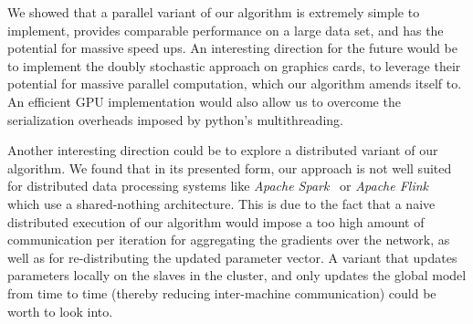 \documentclass{article} %
\begin{document}
We showed that a parallel variant of our algorithm is extremely simple to implement, provides comparable performance on a large data set, and has the potential for massive speed ups. An interesting direction for the future would be to implement the doubly stochastic approach on graphics cards, to leverage their potential for massive parallel computation, which our algorithm amends itself to. An efficient GPU implementation would also allow us to overcome the serialization overheads imposed by python's multithreading.

Another interesting direction could be to explore a distributed variant of our algorithm. We found that in its presented form, our approach is not well suited for distributed data processing systems like \textit{Apache Spark}~\cite{Zaharia2012} or \textit{Apache Flink}~\cite{Alexandrov2014} which use a shared-nothing architecture. This is due to the fact that a naive distributed execution of our algorithm would impose a too high amount of communication per iteration for aggregating the gradients over the network, as well as for re-distributing the updated parameter vector. A variant that updates parameters locally on the slaves in the cluster, and only updates the global model from time to time (thereby reducing inter-machine communication) could be worth to look into. 

\newpage

{\small
  
  }
\end{document}
